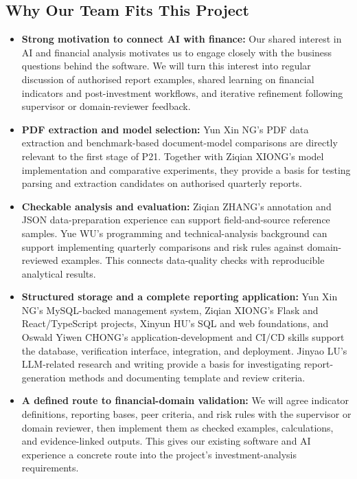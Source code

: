 \documentclass[a4paper,12pt]{article}
\begin{document}
\subsection{Why Our Team Fits This Project}
\begin{itemize}
  \item \textbf{Strong motivation to connect AI with finance:} Our shared interest in AI and financial analysis motivates us to engage closely with the business questions behind the software. We will turn this interest into regular discussion of authorised report examples, shared learning on financial indicators and post-investment workflows, and iterative refinement following supervisor or domain-reviewer feedback.
  \item \textbf{PDF extraction and model selection:} Yun Xin NG's PDF data extraction and benchmark-based document-model comparisons are directly relevant to the first stage of P21. Together with Ziqian XIONG's model implementation and comparative experiments, they provide a basis for testing parsing and extraction candidates on authorised quarterly reports.
  \item \textbf{Checkable analysis and evaluation:} Ziqian ZHANG's annotation and JSON data-preparation experience can support field-and-source reference samples. Yue WU's programming and technical-analysis background can support implementing quarterly comparisons and risk rules against domain-reviewed examples. This connects data-quality checks with reproducible analytical results.
  \item \textbf{Structured storage and a complete reporting application:} Yun Xin NG's MySQL-backed management system, Ziqian XIONG's Flask and React/TypeScript projects, Xinyun HU's SQL and web foundations, and Oswald Yiwen CHONG's application-development and CI/CD skills support the database, verification interface, integration, and deployment. Jinyao LU's LLM-related research and writing provide a basis for investigating report-generation methods and documenting template and review criteria.
  \item \textbf{A defined route to financial-domain validation:} We will agree indicator definitions, reporting bases, peer criteria, and risk rules with the supervisor or domain reviewer, then implement them as checked examples, calculations, and evidence-linked outputs. This gives our existing software and AI experience a concrete route into the project's investment-analysis requirements.
\end{itemize}
\end{document}
